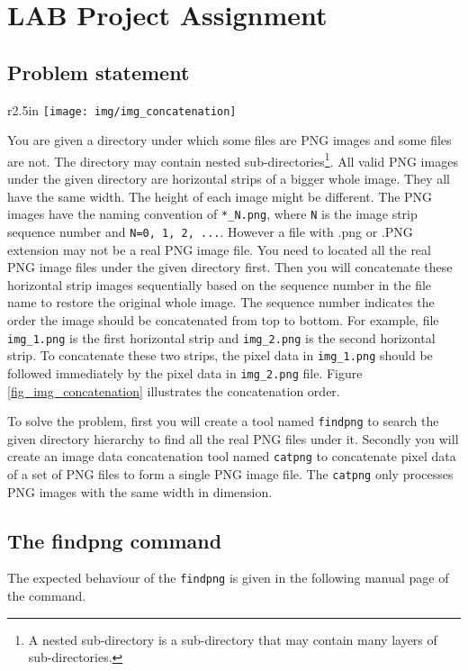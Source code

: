 \section{LAB Project Assignment}
\subsection{Problem statement}

\begin{wrapfigure}{r}{2.5in}
  \texttt{[image: img/img\_concatenation]}
  \caption{Image Concatenation Illustration}
\label{fig_img_concatenation}
\end{wrapfigure}

You are given a directory under which some files are PNG images and some files are not. The directory may contain nested sub-directories\footnote{A nested sub-directory is a sub-directory that may contain many layers of sub-directories.}. All valid PNG images under the given directory are horizontal strips of a bigger whole image. They all have the same width. The height of each image might be different. The PNG images have the naming convention of \verb+*_N.png+, where \verb+N+ is the image strip sequence number and \verb+N=0, 1, 2, ...+. However a file with .png or .PNG extension may not be a real PNG image file. You need to located all the real PNG image files under the given directory first. Then you will concatenate these horizontal strip images sequentially based on the sequence number in the file name to restore the original whole image. The sequence number indicates the order the image should be concatenated from top to bottom. For example, file \verb+img_1.png+ is the first horizontal strip and \verb+img_2.png+ is the second horizontal strip. To concatenate these two strips, the pixel data in \verb+img_1.png+ should be followed immediately by the pixel data in \verb+img_2.png+ file. Figure \ref{fig_img_concatenation} illustrates the concatenation order.

To solve the problem, first you will create a tool named \verb+findpng+ to search the given directory hierarchy to find all the real PNG files under it. Secondly you will create an image data concatenation tool named \verb+catpng+ to concatenate pixel data of a set of PNG files to form a single PNG image file. The \verb+catpng+ only processes PNG images with the same width in dimension.
\subsection{The findpng command}
The expected behaviour of the \verb+findpng+ is given in the following manual page of the command.
